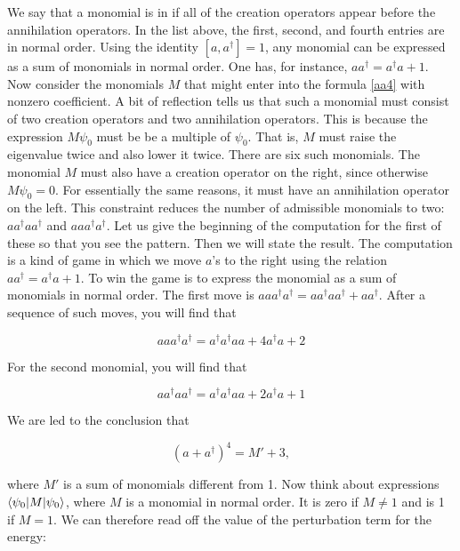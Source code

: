 We say that a monomial is in  if all of the creation operators appear before the annihilation operators.  In the list above, the first, second, and fourth entries are in normal order.  Using the identity $[a,a^\dagger] = 1$, any monomial can be expressed as a sum of monomials in normal order.  One has, for instance, $aa^\dagger = a^\dagger a + 1$.  Now consider the monomials $M$ that might enter into the formula \eqref{aa4} with nonzero coefficient.  A bit of reflection tells us that such a monomial must consist of two creation operators and two annihilation operators.  This is because the expression $M\psi_0$ must be be a multiple of $\psi_0$.  That is, $M$ must raise the eigenvalue twice and also lower it twice. There are six such monomials. The monomial $M$ must also have a creation operator on the right, since otherwise $M\psi_0 = 0$.  For essentially the same reasons, it must have an annihilation operator on the left.  This constraint reduces the number of admissible monomials to two: $aa^\dagger aa^\dagger$ and
$aaa^\dagger a^\dagger$.  Let us give the beginning of the computation for the first of these so that you see the pattern.  Then we will state the result. The computation is a kind of game in which we move $a$'s to the right using the relation $ a a^\dagger = a^\dagger a + 1$.  To win the game is to express the monomial as a sum of monomials in normal order.  The first move is $aaa^\dagger a^\dagger = aa^\dagger a a^\dagger + aa^\dagger$.  After a sequence of such moves, you will find that

\begin{equation}
aaa^\dagger a^\dagger = a^\dagger a^\dagger  aa + 4a^\dagger a + 2
\end{equation}

For the second monomial, you will find that

\begin{equation}
aa^\dagger a a^\dagger =  a^\dagger a^\dagger  aa + 2a^\dagger a + 1
\end{equation}

We are led to the conclusion that

\begin{equation}
(a + a^\dagger )^4 = M' + 3,
\end{equation}

where $M'$ is a sum of monomials different from 1.
Now think about expressions $\langle \psi_0 | M | \psi_0 \rangle$, where
$M$ is a  monomial in normal order.  It is zero if $M \ne 1$ and
is 1 if  $M = 1$.  We can therefore read off the value of the perturbation term for the energy:

